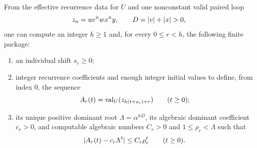 \begin{lemma}
  \label{lem:effective-paired-loop-transfer}
  From the effective recurrence data for \(U\) and one nonconstant valid
  paired loop
  \[
    z_n=u v^n w x^n y,\qquad D=\lvert v \rvert+\lvert x \rvert>0,
  \]
  one can compute an integer \(h\ge1\) and, for every \(0\le r<h\), the
  following finite package:
  \begin{enumerate}[label=\textup{(\alph*)}]
    \item an individual shift \(s_r\ge0\);
    \item integer recurrence coefficients and enough integer initial values
      to define, from index \(0\), the sequence
      \[
        A_r(t)=\operatorname{val}_U(z_{h(t+s_r)+r})\qquad(t\ge0);
      \]
    \item its unique positive dominant root
      \(\Lambda=\alpha^{hD}\), its algebraic dominant coefficient
      \(c_r>0\), and computable algebraic numbers
      \(C_r>0\) and \(1\le\rho_r<\Lambda\) such that
      \begin{equation}
        \lvert A_r(t)-c_r\Lambda^t \rvert\le C_r\rho_r^t
        \qquad(t\ge0).
        \label{eq:effective-loop-error}
      \end{equation}
  \end{enumerate}
\end{lemma}

